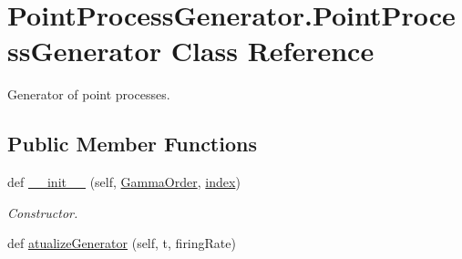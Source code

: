 \hypertarget{class_point_process_generator_1_1_point_process_generator}{}\section{Point\+Process\+Generator.\+Point\+Process\+Generator Class Reference}
\label{class_point_process_generator_1_1_point_process_generator}


Generator of point processes.  


\subsection*{Public Member Functions}
\begin{DoxyCompactItemize}
\item 
def \hyperlink{class_point_process_generator_1_1_point_process_generator_aa68db702aedaee038800dfe10422de6a}{\+\_\+\+\_\+init\+\_\+\+\_\+} (self, \hyperlink{class_point_process_generator_1_1_point_process_generator_aa6c6513cd7f00dbdceb5f945a07cffee}{Gamma\+Order}, \hyperlink{class_point_process_generator_1_1_point_process_generator_a57f6c8af8fd3d37ed8ab2f4abe9be5d8}{index})
\begin{DoxyCompactList}\small\item\em Constructor. \end{DoxyCompactList}\item 
def \hyperlink{class_point_process_generator_1_1_point_process_generator_a744e7d5fc7850ddb785d2fafdc04e587}{atualize\+Generator} (self, t, firing\+Rate)
\end{DoxyCompactItemize}
